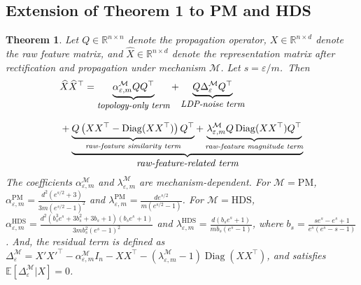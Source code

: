 \documentclass[conference,compsoc]{IEEEtran}
\theoremstyle{boldplain}
\newtheorem{theorem}{Theorem}
\theoremstyle{bolddefinition}
\theoremstyle{remark}
\begin{document}
{\subsection{Extension of Theorem 1 to PM and HDS}
\label{app:extension_theorem_one_pm_hds}
\begin{theorem}
\label{thm:source_decomposition_pm_hds}
Let $Q\in\mathbb{R}^{n\times n}$ denote the propagation operator, $X\in\mathbb{R}^{n\times d}$ denote the raw feature matrix, and $\widehat X\in\mathbb{R}^{n\times d}$ denote the representation matrix after rectification and propagation under mechanism $\mathcal{M}$. Let $s=\varepsilon/m$.~Then
\begin{equation}
\begin{aligned}
& \widehat X\widehat X^\top = 
\underbrace{ \alpha_{\varepsilon,m}^{\mathcal{M}}QQ^\top}_{\textit{\small topology-only term}}
+
\underbrace{Q\Delta_{\varepsilon}^{\mathcal{M}}Q^\top}_{\textit{\small LDP-noise term}}
\\[0.8em] 
& + \underbrace{
    \underbrace{Q\left(XX^\top-\operatorname{Diag}(XX^\top)\right)Q^\top}_{\textit{\scriptsize raw-feature similarity term}}
    +
    \underbrace{\lambda_{\varepsilon,m}^{\mathcal{M}} Q\operatorname{Diag}(XX^\top)Q^\top}_{\textit{\scriptsize raw-feature magnitude term}}
}_{\textit{\normalsize raw-feature-related term}}
\end{aligned}
\label{eq:pm_hds_decomposition}
\end{equation}
The coefficients $\alpha_{\varepsilon,m}^{\mathcal{M}}$ and $\lambda_{\varepsilon,m}^{\mathcal{M}}$ are mechanism-dependent. 
For $\mathcal{M}=\mathrm{PM}$,
$\alpha_{\varepsilon,m}^{\mathrm{PM}}=\frac{d^2(e^{s/2}+3)}{3m(e^{s/2}-1)^2}$ and
$\lambda_{\varepsilon,m}^{\mathrm{PM}}=\frac{d e^{s/2}}{m(e^{s/2}-1)}$.
For $\mathcal{M}=\mathrm{HDS}$,
$\alpha_{\varepsilon,m}^{\mathrm{HDS}}=\frac{d^2(b_s^3e^s+3b_s^2+3b_s+1)(b_s e^s+1)}{3mb_s^2(e^s-1)^2}$ and
$\lambda_{\varepsilon,m}^{\mathrm{HDS}}=\frac{d(b_s e^s+1)}{mb_s(e^s-1)}$,
where $b_s=\frac{s e^s-e^s+1}{e^s(e^s-s-1)}$.
And, the residual term is defined as
$\Delta_{\varepsilon}^{\mathcal{M}}
=
X'X'^\top-\alpha_{\varepsilon,m}^{\mathcal{M}}I_n
-XX^\top
-(\lambda_{\varepsilon,m}^{\mathcal{M}}-1)\operatorname{Diag}(XX^\top)$,
and satisfies $\mathbb{E}[\Delta_{\varepsilon}^{\mathcal{M}}|X]=0$.
\end{theorem}


}
\end{document}
